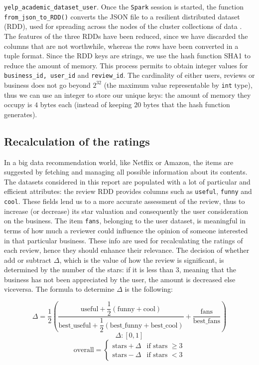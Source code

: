 \documentclass{article}
\begin{document}
\texttt{yelp\_academic\_dataset\_user}. Once the \texttt{Spark} session is started, the function \texttt{from\_json\_to\_RDD()} converts the JSON file to a resilient distributed dataset (RDD), used for spreading across the nodes of the cluster collections of data \cite{rdd}.
The features of the three RDDs have been reduced, since we have discarded the columns that are not worthwhile, whereas the rows have been converted in a tuple format. 
Since the RDD keys are strings, we use the hash function SHA1 to reduce the amount of memory. This process permits to obtain integer values for \texttt{business\_id, user\_id} and \texttt{review\_id}. The cardinality of either users, reviews or business does not go beyond $2^{32}$ (the maximum value representable by \texttt{int} type), thus we can use an integer to store our unique keys: the amount of memory they occupy is $4$ bytes each (instead of keeping $20$ bytes that the hash function generates). 

\subsection{Recalculation of the ratings}
In a big data recommendation world, like Netflix or Amazon, the items are suggested by fetching and managing all possible information about its contents. The datasets considered in this report are populated with a lot of particular and efficient attributes: the review RDD provides columns such as \texttt{useful}, \texttt{funny} and \texttt{cool}. These fields lend us to a more accurate assessment of the review, thus to increase (or decrease) its star valuation and consequently the user consideration on the business. The item \texttt{fans}, belonging to the user dataset, is meaningful in terms of how much a reviewer could influence the opinion of someone interested in that particular business. These info are used for recalculating the ratings of each review, hence they should enhance their relevance. The decision of whether add or subtract $\Delta$, which is the value of how the review is significant, is determined by the number of the stars: if it is less than $3$, meaning that the business has not been appreciated by the user, the amount is decreased else viceversa.  The formula to determine $\Delta$ is the following:

$$
  \Delta = \dfrac{1}{2} 
              \left( 
                  \dfrac{\text{useful} + \dfrac{1}{2}(\text{funny} + \text{cool})} 
                        {\text{best\_useful} + \dfrac{1}{2}(\text{best\_funny} + \text{best\_cool})}
                        + 
                  \dfrac{\text{fans}}
                        {\text{best\_fans}}
              \right)
$$
$$
\Delta : [0, 1]
$$
$$
  \text{overall} = \begin{cases} 
              \text{stars} + \Delta & \text{if stars } \ge 3\\
              \text{stars} - \Delta & \text{if stars } < 3
            \end{cases}
$$
\end{document}
